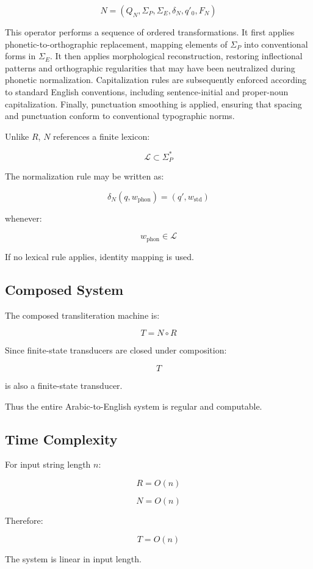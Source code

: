 \documentclass[12pt]{article}
\begin{document}
\[
N = (Q_N, \Sigma_P, \Sigma_E, \delta_N, q'_0, F_N)
\]

This operator performs a sequence of ordered transformations. It first applies phonetic-to-orthographic replacement, mapping elements of $\Sigma_P$ into conventional forms in $\Sigma_E$. It then applies morphological reconstruction, restoring inflectional patterns and orthographic regularities that may have been neutralized during phonetic normalization. Capitalization rules are subsequently enforced according to standard English conventions, including sentence-initial and proper-noun capitalization. Finally, punctuation smoothing is applied, ensuring that spacing and punctuation conform to conventional typographic norms.

Unlike $R$, $N$ references a finite lexicon:

\[
\mathcal{L} \subset \Sigma_P^\ast
\]

The normalization rule may be written as:

\[
\delta_N(q, w_{\text{phon}}) = (q', w_{\text{std}})
\]

whenever:

\[
w_{\text{phon}} \in \mathcal{L}
\]

If no lexical rule applies, identity mapping is used.

\subsection{Composed System}

The composed transliteration machine is:

\[
T = N \circ R
\]

Since finite-state transducers are closed under composition:

\[
T
\]

is also a finite-state transducer.

Thus the entire Arabic-to-English system is regular and computable.

\subsection{Time Complexity}

For input string length $n$:

\[
R = O(n)
\]

\[
N = O(n)
\]

Therefore:

\[
T = O(n)
\]

The system is linear in input length.
\end{document}
